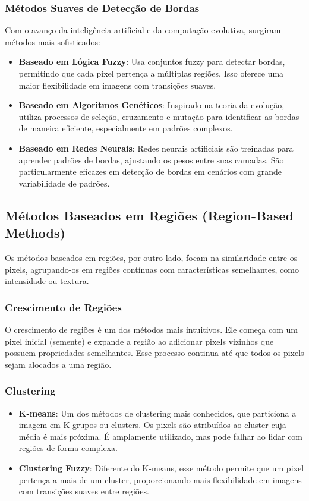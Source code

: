 \subsubsection{Métodos Suaves de Detecção de Bordas}
Com o avanço da inteligência artificial e da computação evolutiva, surgiram métodos mais sofisticados:
\begin{itemize}
    \item \textbf{Baseado em Lógica Fuzzy}: Usa conjuntos fuzzy para detectar bordas, permitindo que cada pixel pertença a múltiplas regiões. Isso oferece uma maior flexibilidade em imagens com transições suaves.
    \item \textbf{Baseado em Algoritmos Genéticos}: Inspirado na teoria da evolução, utiliza processos de seleção, cruzamento e mutação para identificar as bordas de maneira eficiente, especialmente em padrões complexos.
    \item \textbf{Baseado em Redes Neurais}: Redes neurais artificiais são treinadas para aprender padrões de bordas, ajustando os pesos entre suas camadas. São particularmente eficazes em detecção de bordas em cenários com grande variabilidade de padrões.
\end{itemize}

\subsection{Métodos Baseados em Regiões (Region-Based Methods)}
Os métodos baseados em regiões, por outro lado, focam na similaridade entre os pixels, agrupando-os em regiões contínuas com características semelhantes, como intensidade ou textura.

\subsubsection{Crescimento de Regiões}
O crescimento de regiões é um dos métodos mais intuitivos. Ele começa com um pixel inicial (semente) e expande a região ao adicionar pixels vizinhos que possuem propriedades semelhantes. Esse processo continua até que todos os pixels sejam alocados a uma região.

\subsubsection{Clustering}
\begin{itemize}
    \item \textbf{K-means}: Um dos métodos de clustering mais conhecidos, que particiona a imagem em K grupos ou clusters. Os pixels são atribuídos ao cluster cuja média é mais próxima. É amplamente utilizado, mas pode falhar ao lidar com regiões de forma complexa.
    \item \textbf{Clustering Fuzzy}: Diferente do K-means, esse método permite que um pixel pertença a mais de um cluster, proporcionando mais flexibilidade em imagens com transições suaves entre regiões.
\end{itemize}

